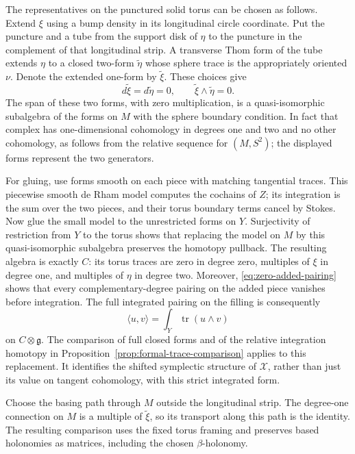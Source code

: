 The representatives on the punctured solid torus can be chosen as
follows.  Extend \(\xi\) using a bump density in its longitudinal
circle coordinate.  Put the puncture and a tube from the support disk
of \(\eta\) to the puncture in the complement of that longitudinal
strip.  A transverse Thom form of the tube extends \(\eta\) to a
closed two-form \(\widetilde\eta\) whose sphere trace is the appropriately
oriented \(\nu\).  Denote the extended one-form by
\(\widetilde\xi\).  These choices give
\begin{equation}
\label{eq:zero-added-pairing}
 d\widetilde\xi=d\widetilde\eta=0,
 \qquad \widetilde\xi\wedge\widetilde\eta=0.
\end{equation}
The span of these two forms, with zero multiplication, is a
quasi-isomorphic subalgebra of the forms on \(M\) with the sphere
boundary condition.  In fact that complex has one-dimensional
cohomology in degrees one and two and no other cohomology, as follows
from the relative sequence for \((M,S^2)\); the displayed forms
represent the two generators.

For gluing, use forms smooth on each piece with matching tangential
traces.  This piecewise smooth de Rham model computes the cochains of
\(Z\); its integration is the sum over the two pieces, and their torus
boundary terms cancel by Stokes.  Now glue the small model to the
unrestricted forms on \(Y\).
Surjectivity of restriction from \(Y\) to the torus shows that replacing
the model on \(M\) by this quasi-isomorphic subalgebra preserves the
homotopy pullback.  The resulting algebra is exactly \(C\): its torus
traces are zero in degree zero, multiples of \(\xi\) in degree one,
and multiples of \(\eta\) in degree two.  Moreover,
\eqref{eq:zero-added-pairing} shows that every complementary-degree
pairing on the added piece vanishes before integration.  The full
integrated pairing on the filling is consequently
\begin{equation}
\label{eq:edge-cyclic-pairing}
                \langle u,v\rangle
                  =\int_Y\operatorname{tr}(u\wedge v)
\end{equation}
on \(C\otimes\mathfrak g\).  The comparison of full closed forms and
of the relative integration homotopy in
Proposition~\ref{prop:formal-trace-comparison} applies to this
replacement.  It identifies the shifted symplectic structure of
\(\mathcal X\), rather than just its value on tangent cohomology, with
this strict integrated form.

Choose the basing path through \(M\) outside the longitudinal strip.
The degree-one connection on \(M\) is a multiple of
\(\widetilde\xi\), so its transport along this path is the identity.
The resulting comparison uses the fixed torus framing and preserves
based holonomies as matrices, including the chosen \(\beta\)-holonomy.

